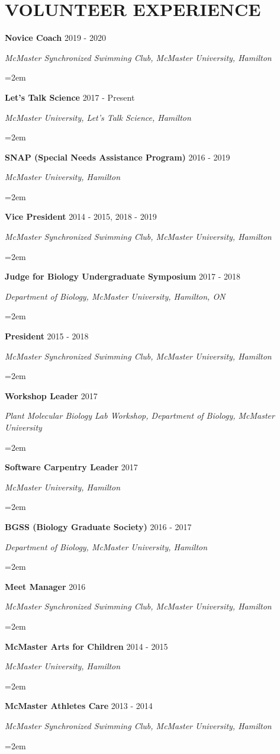 \documentclass[paper=a4,fontsize=11pt]{scrartcl}	 			%
\newcommand{\sepspace}{\vspace*{1em}}			%
\newcommand{\NewPart}[1]{\section*{\uppercase{#1}}}
\newcommand{\EducationEntry}[4]{
		\noindent \textbf{#1} \hfill 					%
		\colorbox{White}{%
			\parbox{10em}{%
			\hfill\color{Black}#2}} \par				%
		\noindent \textit{#3} \par					%
		\noindent\hangindent=2em\hangafter=0 \small #4 	%
		\normalsize \par}
\newcommand{\WorkEntry}[4]{						%
		\noindent \textbf{#1} \hfill 					%
		\colorbox{White}{\color{Black}#2} \par		%
		\noindent \textit{#3} \par					%
		\noindent\hangindent=2em\hangafter=0 \small #4 	%
		\normalsize \par}
\begin{document}
%
\NewPart{Volunteer Experience}{}
\WorkEntry{Novice Coach}{2019 - 2020}{McMaster Synchronized Swimming Club, McMaster University, Hamilton}{}
\WorkEntry{Let's Talk Science}{2017 - Present}{McMaster University, Let's Talk Science, Hamilton}{}
\WorkEntry{SNAP (Special Needs Assistance Program)}{2016 - 2019}{McMaster University, Hamilton}{}
\WorkEntry{Vice President}{2014 - 2015, 2018 - 2019}{McMaster Synchronized Swimming Club, McMaster University, Hamilton}{}
\WorkEntry{Judge for Biology Undergraduate Symposium}{2017 - 2018}{Department of Biology, McMaster University, Hamilton, ON}{}
\WorkEntry{President}{2015 - 2018}{McMaster Synchronized Swimming Club, McMaster University, Hamilton}{}
\WorkEntry{Workshop Leader}{2017}{Plant Molecular Biology Lab Workshop, Department of Biology, McMaster University}{}
\WorkEntry{Software Carpentry Leader}{2017}{McMaster University, Hamilton}{}
\WorkEntry{BGSS (Biology Graduate Society)}{2016 - 2017}{Department of Biology, McMaster University, Hamilton}{}
\WorkEntry{Meet Manager}{2016}{McMaster Synchronized Swimming Club, McMaster University, Hamilton}{}
\WorkEntry{McMaster Arts for Children}{2014 - 2015}{McMaster University, Hamilton}{}
\WorkEntry{McMaster Athletes Care}{2013 - 2014}{McMaster Synchronized Swimming Club, McMaster University, Hamilton}{}
\end{document}
